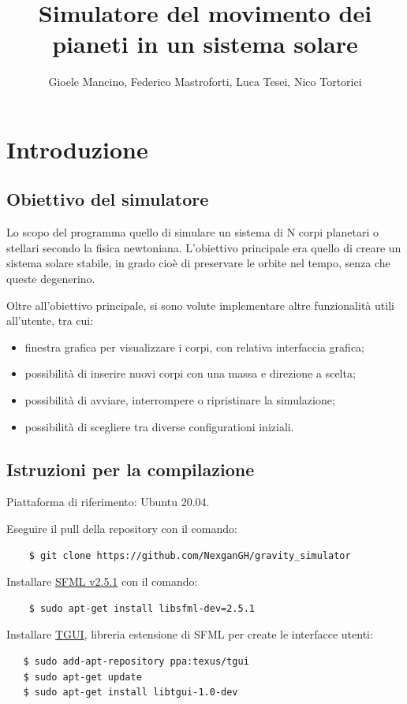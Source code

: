 \documentclass{article}
\title{Simulatore del movimento dei pianeti in un sistema solare}
\author{Gioele Mancino, Federico Mastroforti, Luca Tesei, Nico Tortorici}
\begin{document}
\maketitle
\section{Introduzione}

\subsection{Obiettivo del simulatore}
Lo scopo del programma quello di simulare un sistema di N corpi planetari o stellari secondo la fisica newtoniana. L'obiettivo principale era quello di creare un sistema solare stabile, in grado cioè di preservare le orbite nel tempo, senza che queste degenerino.

Oltre all'obiettivo principale, si sono volute implementare altre funzionalità utili all'utente, tra cui:
\begin{itemize}
    \item finestra grafica per visualizzare i corpi, con relativa interfaccia grafica;
    \item possibilità di inserire nuovi corpi con una massa e direzione a scelta;
    \item possibilità di avviare, interrompere o ripristinare la simulazione;
    \item possibilità di scegliere tra diverse configurationi iniziali.
\end{itemize}

\subsection{Istruzioni per la compilazione}

Piattaforma di riferimento: Ubuntu 20.04.

Eseguire il pull della repository con il comando:
\begin{verbatim}
    $ git clone https://github.com/NexganGH/gravity_simulator
\end{verbatim}

Installare \href{https://www.sfml-dev.org/tutorials/2.5/start-linux.php}{SFML v2.5.1} con il comando:
\begin{verbatim}
    $ sudo apt-get install libsfml-dev=2.5.1
\end{verbatim}

Installare \href{https://www.sfml-dev.org/tutorials/2.5/start-linux.php}{TGUI}, libreria estensione di SFML per create le interfacce utenti:
\begin{verbatim}
   $ sudo add-apt-repository ppa:texus/tgui
   $ sudo apt-get update
   $ sudo apt-get install libtgui-1.0-dev
    \end{verbatim}
\end{document}
